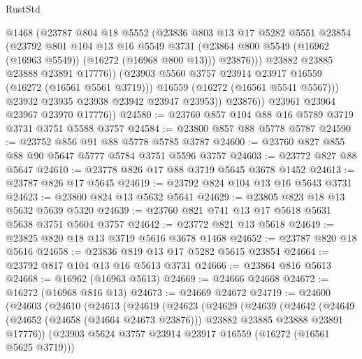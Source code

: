 \begin{lexlean}{RustStd}
\begin{coremodule}
                      @1468
                      (@23787
                        @804
                        @18
                        @5552
                        (@23836
                          @803
                          @13
                          @17
                          @5282
                          @5551
                          @23854
                          (@23792
                            @801
                            @104
                            @13
                            @16
                            @5549
                            @3731
                            (@23864 @800 @5549 (@16962 (@16963 @5549)) (@16272 (@16968 @800 @13)))
                            @23876)))
                      @23882
                      @23885
                      @23888
                      @23891
                      @17776))
                  (@23903 @5560 @3757 @23914 @23917 @16559 (@16272 (@16561 @5561 @3719)))
                  @16559
                  (@16272 (@16561 @5541 @5567)))
                @23932
                @23935
                @23938
                @23942
                @23947
                @23953))
            @23876))
        @23961
        @23964
        @23967
        @23970
        @17776))
@24580 := @23760 @857 @104 @88 @16 @5789 @3719 @3731 @3751 @5588 @3757
@24584 := @23800 @857 @88 @5778 @5787
@24590 := @23752 @856 @91 @88 @5778 @5785 @3787
@24600 := @23760 @827 @855 @88 @90 @5647 @5777 @5784 @3751 @5596 @3757
@24603 := @23772 @827 @88 @5647
@24610 := @23778 @826 @17 @88 @3719 @5645 @3678 @1452
@24613 := @23787 @826 @17 @5645
@24619 := @23792 @824 @104 @13 @16 @5643 @3731
@24623 := @23800 @824 @13 @5632 @5641
@24629 := @23805 @823 @18 @13 @5632 @5639 @5320
@24639 := @23760 @821 @741 @13 @17 @5618 @5631 @5638 @3751 @5604 @3757
@24642 := @23772 @821 @13 @5618
@24649 := @23825 @820 @18 @13 @3719 @5616 @3678 @1468
@24652 := @23787 @820 @18 @5616
@24658 := @23836 @819 @13 @17 @5282 @5615 @23854
@24664 := @23792 @817 @104 @13 @16 @5613 @3731
@24666 := @23864 @816 @5613
@24668 := @16962 (@16963 @5613)
@24669 := @24666 @24668
@24672 := @16272 (@16968 @816 @13)
@24673 := @24669 @24672
@24719 := @24600
    (@24603
      (@24610
        (@24613
          (@24619
            (@24623
              (@24629
                (@24639
                  (@24642
                    (@24649
                      (@24652 (@24658 (@24664 @24673 @23876)))
                      @23882
                      @23885
                      @23888
                      @23891
                      @17776))
                  (@23903 @5624 @3757 @23914 @23917 @16559 (@16272 (@16561 @5625 @3719)))

\end{coremodule}
\end{lexlean}
